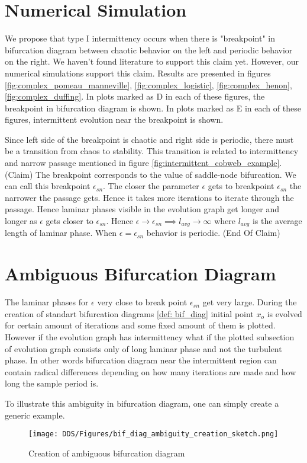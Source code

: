 \section{Numerical Simulation}
We propose that type I intermittency occurs when there is "breakpoint" in bifurcation diagram between chaotic behavior on the left and periodic behavior on the right.
We haven't found literature to support this claim yet.
However, our numerical simulations support this claim.
Results are presented in figures \ref{fig:complex_pomeau_manneville}, \ref{fig:complex_logistic}, \ref{fig:complex_henon}, \ref{fig:complex_duffing}.
In plots marked as D in each of these figures, the breakpoint in bifurcation diagram is shown.
In plots marked as E in each of these figures, intermittent evolution near the breakpoint is shown.
\par
Since left side of the breakpoint is chaotic and right side is periodic, there must be a transition from chaos to stability.
This transition is related to intermittency and narrow passage mentioned in figure \ref{fig:intermittent_cobweb_example}.
(Claim) The breakpoint corresponds to the value of saddle-node bifurcation.
We can call this breakpoint $\epsilon_{sn}$.
The closer the parameter $\epsilon$ gets to breakpoint $\epsilon_{sn}$ the narrower the passage gets.
Hence it takes more iterations to iterate through the passage.
Hence laminar phases visible in the evolution graph get longer and longer as $\epsilon$ gets closer to $\epsilon_{sn}$.
Hence $\epsilon \rightarrow \epsilon_{sn} \implies l_{avg} \rightarrow \infty$ where $l_{avg}$ is the average length of laminar phase.
When $\epsilon = \epsilon_{sn}$ behavior is periodic.
(End Of Claim)

\section{Ambiguous Bifurcation Diagram}
The laminar phases for $\epsilon$ very close to break point $\epsilon_{sn}$ get very large.
During the creation of standart bifurcation diagrams \ref{def: bif_diag} initial point $x_o$ is evolved for certain amount of iterations and some fixed amount of them is plotted.
However if the evolution graph has intermittency what if the plotted subsection of evolution graph consists only of long laminar phase and not the turbulent phase.
In other words bifurcation diagram near the intermittent region can contain radical differences depending on how many iterations are made and how long the sample period is.
\par
To illustrate this ambiguity in bifurcation diagram, one can simply create a generic example.
\begin{figure}[!h]
    \centering
    \texttt{[image: DDS/Figures/bif\_diag\_ambiguity\_creation\_sketch.png]}
    \caption{Creation of ambiguous bifurcation diagram}
    \label{fig:ambiguous_bif_diag}
\end{figure}

